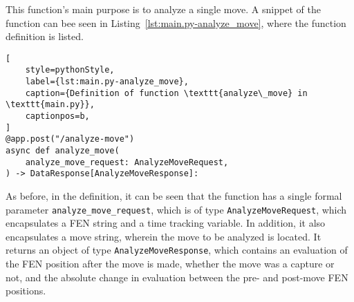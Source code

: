 This function's main purpose is to analyze a single move.
A snippet of the function can bee seen in Listing~\ref{lst:main.py-analyze_move}, where the function definition is
listed.

\begin{lstlisting}[
    style=pythonStyle,
    label={lst:main.py-analyze_move},
    caption={Definition of function \texttt{analyze\_move} in \texttt{main.py}},
    captionpos=b,
]
@app.post("/analyze-move")
async def analyze_move(
    analyze_move_request: AnalyzeMoveRequest,
) -> DataResponse[AnalyzeMoveResponse]:
\end{lstlisting}

As before, in the definition, it can be seen that the function has a single formal parameter
\texttt{analyze\_move\_request}, which is of type \texttt{AnalyzeMoveRequest}, which encapsulates a FEN string and a
time tracking variable.
In addition, it also encapsulates a move string, wherein the move to be analyzed is located.
It returns an object of type \texttt{AnalyzeMoveResponse}, which contains an evaluation of the FEN position after the
move is made, whether the move was a capture or not, and the absolute change in evaluation between the pre- and
post-move FEN positions.
